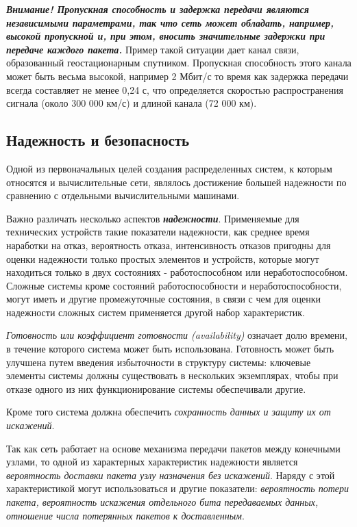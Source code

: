 \textbf{\textit{Внимание! Пропускная способность и задержка передачи являются независимыми параметрами, так что сеть может обладать, например, высокой пропускной и, при этом, вносить значительные задержки при передаче каждого пакета.}}
Пример такой ситуации дает канал связи, образованный геостационарным спутником.
Пропускная способность этого канала может быть весьма высокой, например 2 Мбит/с то время как задержка передачи всегда составляет не менее 0,24 с, что определяется скоростью распространения сигнала (около 300 000 км/с) и длиной канала (72 000 км).

\subsection{Надежность и безопасность}
Одной из первоначальных целей создания распределенных систем, к которым относятся и вычислительные сети, являлось достижение большей надежности по сравнению с отдельными вычислительными машинами.

Важно различать несколько аспектов \textbf{\textit{надежности}}.
Применяемые для технических устройств такие показатели надежности, как среднее время наработки на отказ, вероятность отказа, интенсивность отказов пригодны для оценки надежности только простых элементов и устройств, которые могут находиться только в двух состояниях - работоспособном или неработоспособном.
Сложные системы кроме состояний работоспособности и неработоспособности, могут иметь и другие промежуточные состояния, в связи с чем для оценки надежности сложных систем применяется другой набор характеристик.

\emph{Готовность или коэффициент готовности (availability)} означает долю времени, в течение которого система может быть использована.
Готовность может быть улучшена путем введения избыточности в структуру системы: ключевые элементы системы должны существовать в нескольких экземплярах, чтобы при отказе одного из них функционирование системы обеспечивали другие.

Кроме того система должна обеспечить \emph{сохранность данных и защиту их от искажений}.

Так как сеть работает на основе механизма передачи пакетов между конечными узлами, то одной из характерных характеристик надежности является \emph{вероятность доставки пакета узлу назначения без искажений}.
Наряду с этой характеристикой могут использоваться и другие показатели: \emph{вероятность потери пакета, вероятность искажения отдельного бита передаваемых данных, отношение числа потерянных пакетов к доставленным}.

